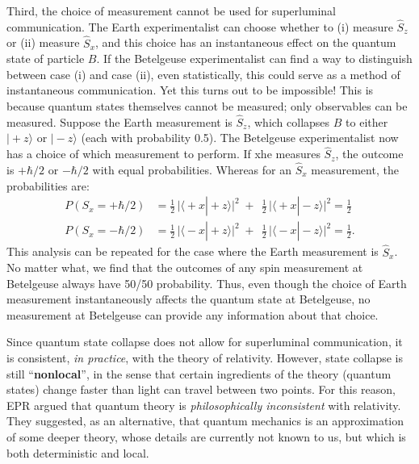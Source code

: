 \documentclass[pra,11pt]{revtex4}
\begin{document}
Third, the choice of measurement cannot be used for superluminal
communication.  The Earth experimentalist can choose whether to (i)
measure $\hat{S}_z$ or (ii) measure $\hat{S}_x$, and this choice has
an instantaneous effect on the quantum state of particle $B$.  If the
Betelgeuse experimentalist can find a way to distinguish between case
(i) and case (ii), even statistically, this could serve as a method of
instantaneous communication.  Yet this turns out to be impossible!
This is because quantum states themselves cannot be measured; only
observables can be measured.  Suppose the Earth measurement is
$\hat{S}_z$, which collapses $B$ to either $|\!+\!z\rangle$ or
$|\!-\!z\rangle$ (each with probability 0.5).  The Betelgeuse
experimentalist now has a choice of which measurement to perform.  If
xhe measures $\hat{S}_z$, the outcome is $+\hbar/2$ or $-\hbar/2$ with
equal probabilities.  Whereas for an $\hat{S}_x$ measurement, the
probabilities are:
$$\begin{aligned}P(S_x = +\hbar/2) &= \frac{1}{2}\, \Big|\langle\!+x|\!+\!z\rangle\Big|^2 \;+\;\, \frac{1}{2}\, \Big|\langle\!+x|\!-\!z\rangle\Big|^2 = \frac{1}{2}\\P(S_x = -\hbar/2) &= \frac{1}{2}\, \Big|\langle\!-x|\!+\!z\rangle\Big|^2 \;+\;\, \frac{1}{2}\, \Big|\langle\!-x|\!-\!z\rangle\Big|^2 = \frac{1}{2}.\end{aligned}$$
This analysis can be repeated for the case where the Earth measurement
is $\hat{S}_x$.  No matter what, we find that the outcomes of any spin
measurement at Betelgeuse always have 50/50 probability.  Thus, even
though the choice of Earth measurement instantaneously affects the
quantum state at Betelgeuse, no measurement at Betelgeuse can provide
any information about that choice.

Since quantum state collapse does not allow for superluminal
communication, it is consistent, \textit{in practice}, with the theory
of relativity.  However, state collapse is still
``\textbf{nonlocal}'', in the sense that certain ingredients of the
theory (quantum states) change faster than light can travel between
two points.  For this reason, EPR argued that quantum theory is
\textit{philosophically inconsistent} with relativity.  They
suggested, as an alternative, that quantum mechanics is an
approximation of some deeper theory, whose details are currently not
known to us, but which is both deterministic and local.
\end{document}
